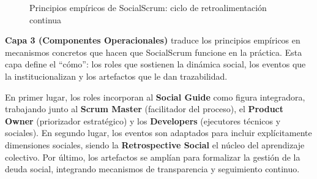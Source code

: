 \begin{figure}[htb]
    \caption{Principios empíricos de SocialScrum: ciclo de retroalimentación continua}
    \label{fig:principios_empiricos}
\end{figure}

\FloatBarrier

\textbf{Capa 3 (Componentes Operacionales)} traduce los principios empíricos en mecanismos concretos que hacen que SocialScrum funcione en la práctica.
Esta capa define el ``cómo'': los roles que sostienen la dinámica social, los eventos que la institucionalizan y los artefactos que le dan trazabilidad.

En primer lugar, los roles incorporan al \textbf{Social Guide} como figura integradora, trabajando junto al \textbf{Scrum Master} (facilitador del proceso), el \textbf{Product Owner} (priorizador estratégico) y los \textbf{Developers} (ejecutores técnicos y sociales).
En segundo lugar, los eventos son adaptados para incluir explícitamente dimensiones sociales, siendo la \textbf{Retrospective Social} el núcleo del aprendizaje colectivo.
Por último, los artefactos se amplían para formalizar la gestión de la deuda social, integrando mecanismos de transparencia y seguimiento continuo.

